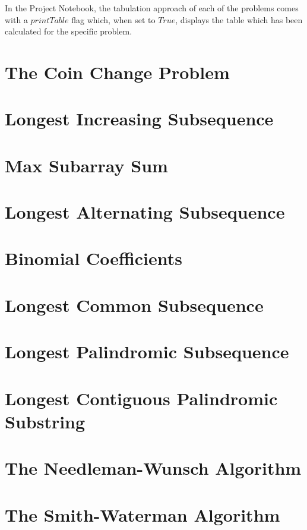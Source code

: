 In the Project Notebook, the tabulation approach of each of the problems comes with a $printTable$ flag which, when set to $True$, displays the table which has been calculated for the specific problem.

\section{The Coin Change Problem}


\section{Longest Increasing Subsequence}


\section{Max Subarray Sum}


\section{Longest Alternating Subsequence}


\section{Binomial Coefficients}


\section{Longest Common Subsequence} \label{section:lcs}


\section{Longest Palindromic Subsequence}


\section{Longest Contiguous Palindromic Substring}


\section{The Needleman-Wunsch Algorithm}


\section{The Smith-Waterman Algorithm}

